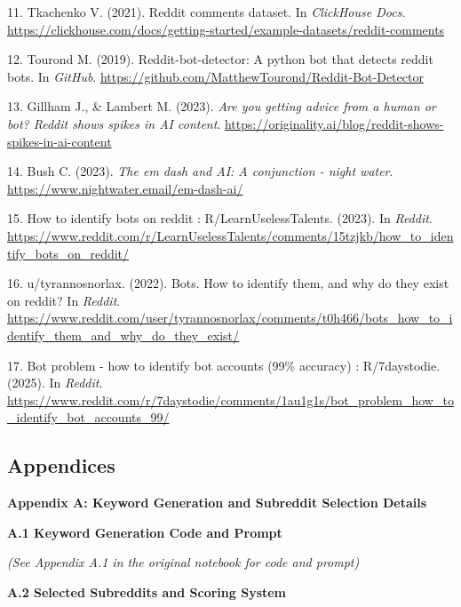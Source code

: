 \documentclass[
  12pt,
  letterpaper,
  DIV=11,
  numbers=noendperiod]{scrartcl}
\newlength{\cslhangindent}
\newenvironment{CSLReferences}[2] %
 {\begin{list}{}{%
  \setlength{\itemindent}{0pt}
  \setlength{\leftmargin}{0pt}
  \setlength{\parsep}{0pt}
  \ifodd #1
   \setlength{\leftmargin}{\cslhangindent}
   \setlength{\itemindent}{-1\cslhangindent}
  \fi
  \setlength{\itemsep}{#2\baselineskip}}}
 {\end{list}}
\begin{document}
\begin{CSLReferences}{1}{0}
11. Tkachenko V. (2021). Reddit comments dataset. In \emph{ClickHouse
Docs}.
\url{https://clickhouse.com/docs/getting-started/example-datasets/reddit-comments}

12. Tourond M. (2019). Reddit-bot-detector: A python bot that detects
reddit bots. In \emph{GitHub}.
\url{https://github.com/MatthewTourond/Reddit-Bot-Detector}

13. Gillham J., \& Lambert M. (2023). \emph{Are you getting advice from
a human or bot? Reddit shows spikes in AI content}.
\url{https://originality.ai/blog/reddit-shows-spikes-in-ai-content}

14. Bush C. (2023). \emph{The em dash and AI: A conjunction - night
water}. \url{https://www.nightwater.email/em-dash-ai/}

15. How to identify bots on reddit : R/LearnUselessTalents. (2023). In
\emph{Reddit}.
\url{https://www.reddit.com/r/LearnUselessTalents/comments/15tzjkb/how_to_identify_bots_on_reddit/}

16. u/tyrannosnorlax. (2022). Bots. How to identify them, and why do
they exist on reddit? In \emph{Reddit}.
\url{https://www.reddit.com/user/tyrannosnorlax/comments/t0h466/bots_how_to_identify_them_and_why_do_they_exist/}

17. Bot problem - how to identify bot accounts (99\% accuracy) :
R/7daystodie. (2025). In \emph{Reddit}.
\url{https://www.reddit.com/r/7daystodie/comments/1au1g1s/bot_problem_how_to_identify_bot_accounts_99/}

\end{CSLReferences}

\subsection{\texorpdfstring{\textbf{Appendices}}{Appendices}}\label{appendices}

\textbf{Appendix A: Keyword Generation and Subreddit Selection Details}

\textbf{A.1 Keyword Generation Code and Prompt}

\emph{(See Appendix A.1 in the original notebook for code and prompt)}

\textbf{A.2 Selected Subreddits and Scoring System}
\end{document}
